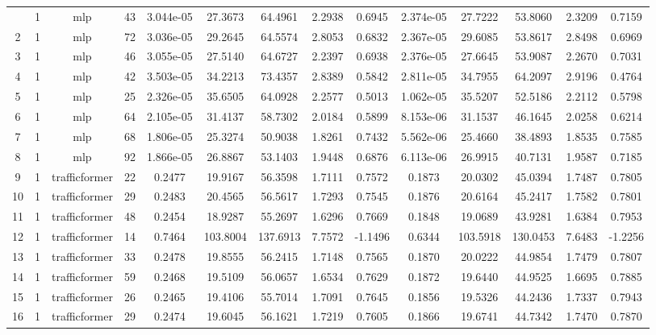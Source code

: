 \begin{landscape}
\begin{longtable}{c | c | c | c | c | c | c | c | c | c | c | c | c | c}
	\bottomrule
	\endlastfoot
	1 & 1 & mlp & 43 & 3.044e-05 & 27.3673 & 64.4961 & 2.2938 & 0.6945 & 2.374e-05 & 27.7222 & 53.8060 & 2.3209 & 0.7159 \\
	2 & 1 & mlp & 72 & 3.036e-05 & 29.2645 & 64.5574 & 2.8053 & 0.6832 & 2.367e-05 & 29.6085 & 53.8617 & 2.8498 & 0.6969 \\
	3 & 1 & mlp & 46 & 3.055e-05 & 27.5140 & 64.6727 & 2.2397 & 0.6938 & 2.376e-05 & 27.6645 & 53.9087 & 2.2670 & 0.7031 \\
	4 & 1 & mlp & 42 & 3.503e-05 & 34.2213 & 73.4357 & 2.8389 & 0.5842 & 2.811e-05 & 34.7955 & 64.2097 & 2.9196 & 0.4764 \\
	5 & 1 & mlp & 25 & 2.326e-05 & 35.6505 & 64.0928 & 2.2577 & 0.5013 & 1.062e-05 & 35.5207 & 52.5186 & 2.2112 & 0.5798 \\
	6 & 1 & mlp & 64 & 2.105e-05 & 31.4137 & 58.7302 & 2.0184 & 0.5899 & 8.153e-06 & 31.1537 & 46.1645 & 2.0258 & 0.6214 \\
	7 & 1 & mlp & 68 & 1.806e-05 & 25.3274 & 50.9038 & 1.8261 & 0.7432 & 5.562e-06 & 25.4660 & 38.4893 & 1.8535 & 0.7585 \\
	8 & 1 & mlp & 92 & 1.866e-05 & 26.8867 & 53.1403 & 1.9448 & 0.6876 & 6.113e-06 & 26.9915 & 40.7131 & 1.9587 & 0.7185 \\
	9 & 1 & trafficformer & 22 & 0.2477 & 19.9167 & 56.3598 & 1.7111 & 0.7572 & 0.1873 & 20.0302 & 45.0394 & 1.7487 & 0.7805 \\
	10 & 1 & trafficformer & 29 & 0.2483 & 20.4565 & 56.5617 & 1.7293 & 0.7545 & 0.1876 & 20.6164 & 45.2417 & 1.7582 & 0.7801 \\
	11 & 1 & trafficformer & 48 & 0.2454 & 18.9287 & 55.2697 & 1.6296 & 0.7669 & 0.1848 & 19.0689 & 43.9281 & 1.6384 & 0.7953 \\
	12 & 1 & trafficformer & 14 & 0.7464 & 103.8004 & 137.6913 & 7.7572 & -1.1496 & 0.6344 & 103.5918 & 130.0453 & 7.6483 & -1.2256 \\
	13 & 1 & trafficformer & 33 & 0.2478 & 19.8555 & 56.2415 & 1.7148 & 0.7565 & 0.1870 & 20.0222 & 44.9854 & 1.7479 & 0.7807 \\
	14 & 1 & trafficformer & 59 & 0.2468 & 19.5109 & 56.0657 & 1.6534 & 0.7629 & 0.1872 & 19.6440 & 44.9525 & 1.6695 & 0.7885 \\
	15 & 1 & trafficformer & 26 & 0.2465 & 19.4106 & 55.7014 & 1.7091 & 0.7645 & 0.1856 & 19.5326 & 44.2436 & 1.7337 & 0.7943 \\
	16 & 1 & trafficformer & 29 & 0.2474 & 19.6045 & 56.1621 & 1.7219 & 0.7605 & 0.1866 & 19.6741 & 44.7342 & 1.7470 & 0.7870 \\

\end{longtable}
\end{landscape}
